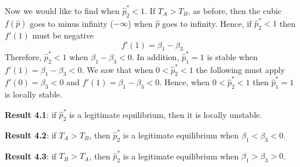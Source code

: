 \documentclass[12pt]{extarticle}
\begin{document}
Now we would like to find when $\hat{p}^*_2<1$.
If $T_A>T_B$, as before, then the cubic $f(\hat{p})$ goes to minus infinity ($-\infty$) when $\hat{p}$ goes to infinity.
Hence, if $\hat{p}^*_2<1$ then $f'(1)$ must be negative %
\begin{equation} \label{eq:derivative_of_phattag-phat_p=1}
  f'(1) = \beta_1 - \beta_3
\end{equation}
Therefore, $\hat{p}^*_2<1$ when $\beta_1-\beta_3<0$.
In addition, $\hat{p}^*_1=1$ is stable when $f'(1) = \beta_1-\beta_3<0$. 
We saw that when $0<\hat{p}^*_2<1$ the following must apply $f'(0)=\beta_3<0$ and $f'(1)=\beta_1-\beta_3<0$.
Hence, when $0<\hat{p}^*_2<1$ then $\hat{p}^*_1=1$ is locally stable.

\textbf{Result 4.1}: if $\hat{p}^*_2$ is a legitimate equilibrium, then it is locally unstable.

\textbf{Result 4.2}: if $T_A>T_B$, then $\hat{p}^*_2$ is a legitimate equilibrium when $\beta_1<\beta_3<0$.

\textbf{Result 4.3}: if $T_B>T_A$, then $\hat{p}^*_2$ is a legitimate equilibrium when $\beta_1>\beta_3>0$. %
\end{document}
